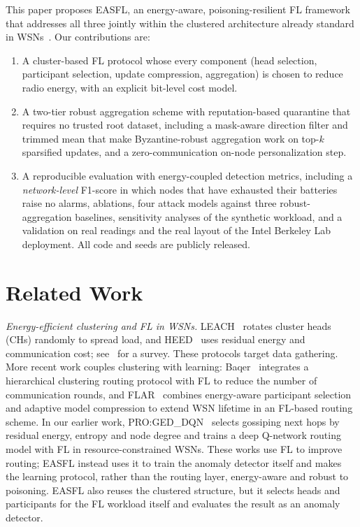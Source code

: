\documentclass[journal]{IEEEtran}
\begin{document}
This paper proposes EASFL, an energy-aware, poisoning-resilient FL framework that addresses all three jointly within the clustered architecture already standard in WSNs~\cite{heinzelman2002,younis2004,abbasi2007}. Our contributions are:
\begin{enumerate}
\item A cluster-based FL protocol whose every component (head selection, participant selection, update compression, aggregation) is chosen to reduce radio energy, with an explicit bit-level cost model.
\item A two-tier robust aggregation scheme with reputation-based quarantine that requires no trusted root dataset, including a mask-aware direction filter and trimmed mean that make Byzantine-robust aggregation work on top-$k$ sparsified updates, and a zero-communication on-node personalization step.
\item A reproducible evaluation with energy-coupled detection metrics, including a \emph{network-level} F1-score in which nodes that have exhausted their batteries raise no alarms, ablations, four attack models against three robust-aggregation baselines, sensitivity analyses of the synthetic workload, and a validation on real readings and the real layout of the Intel Berkeley Lab deployment. All code and seeds are publicly released.
\end{enumerate}

\section{Related Work}
\textit{Energy-efficient clustering and FL in WSNs.} LEACH~\cite{heinzelman2002} rotates cluster heads (CHs) randomly to spread load, and HEED~\cite{younis2004} uses residual energy and communication cost; see~\cite{abbasi2007} for a survey. These protocols target data gathering. More recent work couples clustering with learning: Baqer~\cite{baqer2025} integrates a hierarchical clustering routing protocol with FL to reduce the number of communication rounds, and FLAR~\cite{hawkinson2025} combines energy-aware participant selection and adaptive model compression to extend WSN lifetime in an FL-based routing scheme. In our earlier work, PRO:GED\_DQN~\cite{shivakumar2026gossip} selects gossiping next hops by residual energy, entropy and node degree and trains a deep Q-network routing model with FL in resource-constrained WSNs. These works use FL to improve routing; EASFL instead uses it to train the anomaly detector itself and makes the learning protocol, rather than the routing layer, energy-aware and robust to poisoning. EASFL also reuses the clustered structure, but it selects heads and participants for the FL workload itself and evaluates the result as an anomaly detector.
\end{document}
